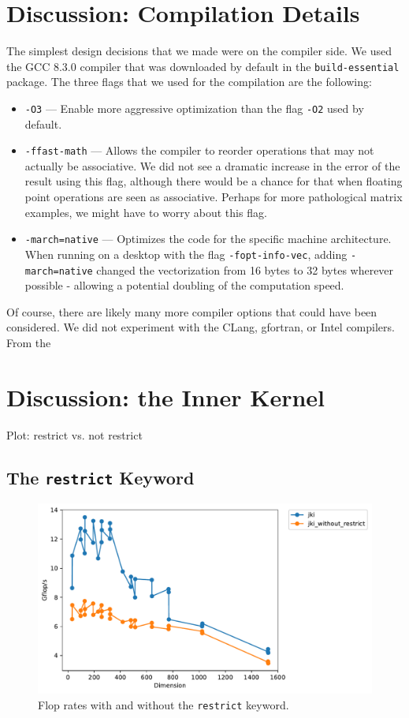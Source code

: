 \documentclass{article}
\begin{document}
\section{Discussion: Compilation Details}
The simplest design decisions that we made were on the compiler side. We used the GCC 8.3.0 compiler that was downloaded by default in the \texttt{build-essential} package. The three flags that we used for the compilation are the following:
\begin{itemize}
	\item \texttt{-O3} --- Enable more aggressive optimization than the flag \texttt{-O2} used by default. 
	\item \texttt{-ffast-math} --- Allows the compiler to reorder operations that may not actually be associative. We did not see a dramatic increase in the error of the result using this flag, although there would be a chance for that when floating point operations are seen as associative. Perhaps for more pathological matrix examples, we might have to worry about this flag.
	\item \texttt{-march=native} --- Optimizes the code for the specific machine architecture. When running on a desktop with the flag \texttt{-fopt-info-vec}, adding \texttt{-march=native} changed the vectorization from 16 bytes to 32 bytes wherever possible - allowing a potential doubling of the computation speed.
\end{itemize}

Of course, there are likely many more compiler options that could have been considered. We did not experiment with the CLang, gfortran, or Intel compilers. From the 


\section{Discussion: the Inner Kernel}
Plot: restrict vs. not restrict

\subsection{The \texttt{restrict} Keyword}
\begin{figure}[h!]
    \centering
    \includegraphics[width=0.8\columnwidth]{timing_jki_restrict.pdf}
    \caption{Flop rates with and without the \texttt{restrict} keyword.}
    \label{fig:Restrict}
\end{figure}
\end{document}
